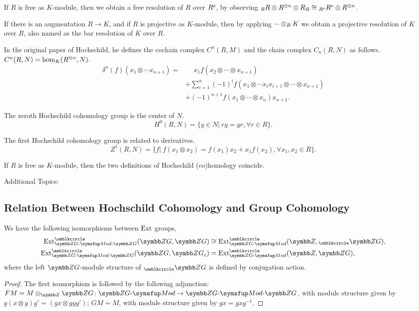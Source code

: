 If $R$ is free as $K$-module, then we obtain a free resolution of $R$ over $R^{\textrm{e}}$, by observing ${}_{R}R\otimes R^{\otimes n}\otimes R_{R}\cong {}_{R^{\textrm{e}}}R^{\textrm{e}}\otimes R^{\otimes n}$.

If there is an augmentation $R\to K$, and if $R$ is projective as $K$-module, then by applying ${-}\otimes_{R}K$ we obtain a projective resolution of $K$ over $R$, also named as the bar resolution of $K$ over $R$.

In the original paper of Hochschild, he defines the cochain complex $C^n(R, M)$ and the chain complex $C_n(R, N)$ as follows. $C^n(R, N)=\operatorname{hom}_K(R^{\otimes n}, N)$.
\begin{equation*}
  \begin{aligned}
    \delta^n(f)(x_1\otimes\dotsb x_{n+1})
    =&\phantom{{}+{}}x_1f(x_2\otimes\dotsb\otimes x_{n+1})\\
    &+\sum_{i=1}^n(-1)^if(x_1\otimes\dotsb x_ix_{i+1}\otimes\dotsb\otimes x_{n+1})\\
    &+(-1)^{n+1}f(x_1\otimes\dotsb\otimes x_n)x_{n+1}.
  \end{aligned}
\end{equation*}%

The zeroth Hochschild cohomology group is the center of $N$.
\begin{equation*}
  H^0(R, N)=\{y\in N\vert\ ry=yr, \forall r\in R\}.
\end{equation*}

The first Hochschild cohomology group is related to derivatives.
\begin{equation*}
  Z^1(R, N)=\{f\vert\ f(x_1\otimes x_2)=f(x_1)x_2+x_1f(x_2), \forall x_1, x_2\in R\}.
\end{equation*}

If $R$ is free as $K$-module, then the two definitions of Hochschild (co)homology coincide.

Additional Topics:

\subsection{Relation Between Hochschild Cohomology and Group Cohomology}

\begin{proposition}
  We have the following isomorphisms between $\operatorname{Ext}$ groups,
  \begin{equation*}
    \begin{aligned}
      \EXT_{\BIMOD{\ZG}{\ZG}}^\BCIR(\ZG, \ZG) &\cong \EXT_{\ZG{\textnormal-}\MOD}^\BCIR(\ZZ, {}_{\BCIR}\ZG),\\
      \EXT^\BCIR_{\BIMOD{\ZG}{\ZG}}(\ZG, \ZG_{\varepsilon}) &= \EXT^\BCIR_{\ZG{\textnormal-}\MOD}(\ZZ, \ZG),
    \end{aligned}
  \end{equation*}
  where the left $\ZG$-module structure of ${}_{\BCIR}\ZG$ is defined by conjugation action.
\end{proposition}

\begin{proof}
  The first isomorphism is followed by the following adjunction: $FM=M\otimes_{\ZZ}\ZG\colon \ZG{\textnormal-}\MOD\to\BIMOD{\ZG}{\ZG}$, with module structure given by $g(x\otimes y)g'=(gx\otimes gyg')$; $GM=M$, with module structure given by $gx=gxg^{-1}$.
\end{proof}
